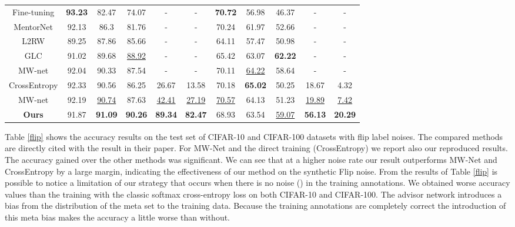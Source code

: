 \documentclass[runningheads]{llncs}
\begin{document}
\begin{table}[!ht]
{\begin{tabular}{c|c|c|c|c|c||c|c|c|c|c}
				Fine-tuning \cite{shu2019meta} & \textbf{93.23} & 82.47          & 74.07          & -              & -              & \textbf{70.72} & 56.98          & 46.37          & -              & -              \\ 
				MentorNet \cite{jiang2018mentornet}   & 92.13 & 86.3           & 81.76          & -              & -              & 70.24 & 61.97          & 52.66          & -              & -              \\ 
				L2RW \cite{ren2018learning}        & 89.25 & 87.86          & 85.66          & -              & -              & 64.11 & 57.47          & 50.98          & -              & -              \\ 
				GLC \cite{hendrycks2018using}        & 91.02 & 89.68          & \underline{88.92}          & -              & -              & 65.42 & 63.07          & \textbf{62.22} & -              & -              \\ 
				MW-net \cite{shu2019meta}     & 92.04 & 90.33          & 87.54          & -              & -              & 70.11 & \underline{64.22}          & 58.64          & -              & -              \\ 
				CrossEntropy     &   92.33    & 90.56          & 86.25          & 26.67          & 13.58          & 70.18       & \textbf{65.02} & 50.25          & 18.67          & 4.32           \\ 
				MW-net \cite{shu2019meta}     &  92.19     & \underline{90.74}          & 87.63          & \underline{42.41}          & \underline{27.19}          & \underline{70.57}      & 64.13          & 51.23          & \underline{19.89}          & \underline{7.42}           \\  \hline
				\textbf{Ours}        &  91.87     & \textbf{91.09} & \textbf{90.26} & \textbf{89.34} & \textbf{82.47} & 68.93      & 63.54          & \underline{59.07}          & \textbf{56.13} & \textbf{20.29} \\ \hline
			\end{tabular}
		}
	\end{table}
	
	Table \ref{flip} shows the accuracy results on the test set of CIFAR-10 and CIFAR-100 datasets with flip label noises. The compared methods are directly cited with the result in their paper. For MW-Net \cite{shu2019meta} and the direct training (CrossEntropy) we report also our reproduced results. The accuracy gained over the other methods was significant. We can see that at a higher noise rate our result outperforms MW-Net and CrossEntropy by a large margin, indicating the effectiveness of our method on the synthetic Flip noise.  From the results of Table \ref{flip} is possible to notice a limitation of our strategy that occurs when there is no noise () in the training annotations. We obtained worse accuracy values than the training with the classic softmax cross-entropy loss on both CIFAR-10 and CIFAR-100. The advisor network introduces a bias from the distribution of the meta set to the training data. Because the training annotations are completely correct the introduction of this meta bias makes the accuracy a little worse than without.
	
\end{document}
